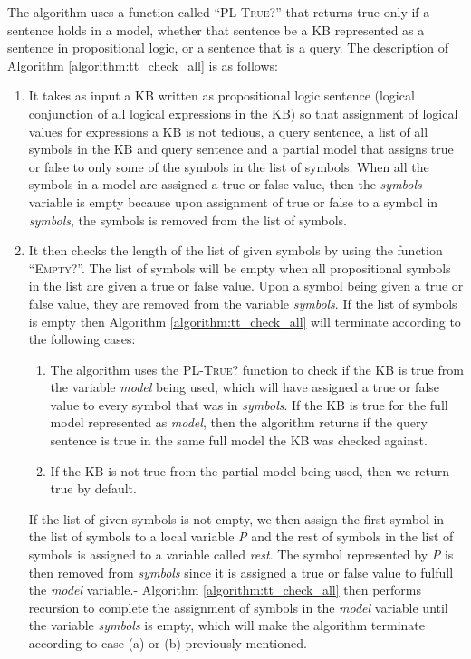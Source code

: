 The algorithm uses a function called ``\textsc{PL-True?}'' that returns true only if a sentence holds in a model, whether that sentence be a KB represented as a sentence in propositional logic, or a sentence that is a query.
The description of Algorithm \ref{algorithm:tt_check_all} is as follows:
\begin{enumerate}

\item It takes as input a KB written as propositional logic sentence (logical conjunction of all logical expressions in the KB) so that assignment of logical values for expressions a KB is not tedious, a query sentence, a list of all symbols in the KB and query sentence and a partial model that assigns true or false to only some of the symbols in the list of symbols. When all the symbols in a model are assigned a true or false value, then the \textit{symbols} variable is empty because upon assignment of true or false to a symbol in \textit{symbols}, the symbols is removed from the list of symbols.

\item It then checks the length of the list of given symbols by using the function ``\textsc{Empty?}''. The list of symbols will be empty when all propositional symbols in the list are given a true or false value. Upon a symbol being given a true or false value, they are removed from the variable \textit{symbols}. If the list of symbols is empty then Algorithm \ref{algorithm:tt_check_all} will terminate according to the following cases:

\begin{enumerate}
\item  The algorithm uses the \textsc{PL-True?} function to check if the KB is true from the variable \textit{model} being used, which will have assigned a true or false value to every symbol that was in \textit{symbols}. If the KB is true for the full model represented as \textit{model}, then the algorithm returns if the query sentence is true in the same full model the KB was checked against.
\item If the KB is not true from the partial model being used, then we return true by default.

\end{enumerate}

If the list of given symbols is not empty, we then assign the first symbol in the list of symbols to a local variable \textit{P} and the rest of symbols in the list of symbols is assigned to a variable called \textit{rest}. The symbol represented by \textit{P} is then removed from \textit{symbols} since it is assigned a true or false value to fulfull the \textit{model} variable.- Algorithm \ref{algorithm:tt_check_all} then performs recursion to complete the assignment of symbols in the \textit{model} variable until the variable \textit{symbols} is empty, which will make the algorithm terminate according to case (a) or (b) previously mentioned.



\end{enumerate}
